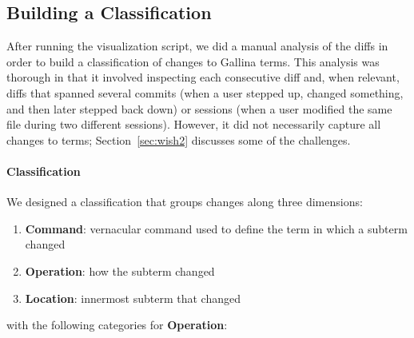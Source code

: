 \subsection{Building a Classification}
\label{sec:class}

After running the visualization script, we did a manual analysis of the diffs
in order to build a classification of changes to Gallina terms.
This analysis was thorough in that it involved inspecting each
consecutive diff and, when relevant, diffs that spanned several commits
(when a user stepped up, changed something, and then later stepped back down)
or sessions (when a user modified the same file during two different sessions).
However, it did not necessarily capture all changes to terms;
Section~\ref{sec:wish2} discusses some of the challenges.

\paragraph{Classification}

We designed a classification that groups changes along three dimensions:

\begin{enumerate}
\item \textbf{Command}: vernacular command used to define the term in
                        which a subterm changed
\item \textbf{Operation}: how the subterm changed
\item \textbf{Location}: innermost subterm that changed
\end{enumerate}
with the following categories for \textbf{Operation}:

